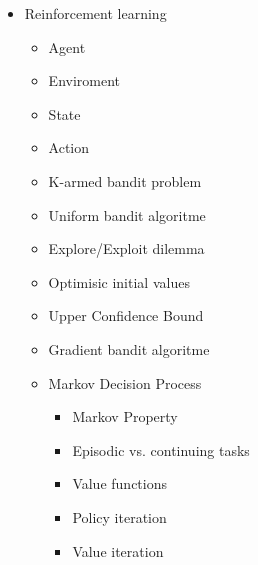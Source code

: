 \documentclass[a4paper,11pt]{article}
\begin{document}
\begin{itemize}
    \item Reinforcement learning
        \begin{itemize}
            \item Agent
            \item Enviroment
            \item State
            \item Action
    \item K-armed bandit problem
    \item Uniform bandit algoritme
    \item Explore/Exploit dilemma
    \item Optimisic initial values
    \item Upper Confidence Bound
    \item Gradient bandit algoritme
    \item Markov Decision Process
        \begin{itemize}
            \item Markov Property
            \item Episodic vs. continuing tasks
            \item Value functions
            \item Policy iteration
            \item Value iteration
        \end{itemize}
        \end{itemize}

\end{itemize}
\end{document}
